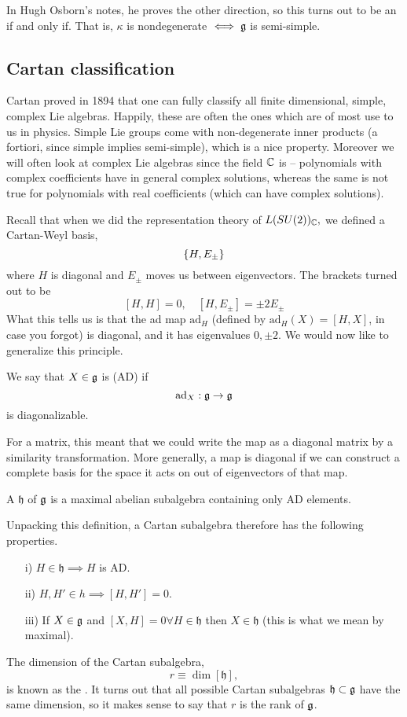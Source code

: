 In Hugh Osborn's notes, he proves the other direction, so this turns out to be an if and only if. That is, $\kappa$ is nondegenerate $\iff \mathfrak{g}$ is semi-simple.

\subsection*{Cartan classification} Cartan proved in 1894 that one can fully classify all finite dimensional, simple, complex Lie algebras. Happily, these are often the ones which are of most use to us in physics. Simple Lie groups come with non-degenerate inner products (a fortiori, since simple implies semi-simple), which is a nice property. Moreover we will often look at complex Lie algebras since the field $\mathbb{C}$ is -- polynomials with complex coefficients have in general complex solutions, whereas the same is not true for polynomials with real coefficients (which can have complex solutions).

Recall that when we did the representation theory of $L(SU(2))_{\mathbb{C}},$ we defined a Cartan-Weyl basis,
$$\{H,E_\pm\}$$ where $H$ is diagonal and $E_\pm$ moves us between eigenvectors. The brackets turned out to be
$$[H,H]=0,\quad [H,E_\pm]=\pm 2 E_{\pm}$$
What this tells us is that the ad map $\text{ad}_H$ (defined by $\text{ad}_H(X)=[H,X]$, in case you forgot) is diagonal, and it has eigenvalues $0,\pm 2$. We would now like to generalize this principle.
\begin{defn}
We say that $X\in \mathfrak{g}$ is  (AD) if
$$\text{ad}_X:\mathfrak{g} \to \mathfrak{g}$$
is diagonalizable.
\end{defn}
For a matrix, this meant that we could write the map as a diagonal matrix by a similarity transformation. More generally, a map is diagonal if we can construct a complete basis for the space it acts on out of eigenvectors of that map.

\begin{defn}
A  $\mathfrak{h}$ of $\mathfrak{g}$ is a maximal abelian subalgebra containing only AD elements.
\end{defn}
Unpacking this definition, a Cartan subalgebra therefore has the following properties.
\begin{itemize}
    \item[i)] $H\in \mathfrak{h}\implies H$ is AD.
    \item[ii)] $H,H'\in h \implies [H,H']=0.$
    \item[iii)] If $X\in \mathfrak{g}$ and $[X,H]=0 \forall H \in \mathfrak{h}$ then $X\in \mathfrak{h}$ (this is what we mean by maximal).
\end{itemize}
\begin{defn}
The dimension of the Cartan subalgebra,
$$r\equiv \dim[\mathfrak{h}],$$
is known as the . It turns out that all possible Cartan subalgebras $\mathfrak{h}\subset \mathfrak{g}$ have the same dimension, so it makes sense to say that $r$ is the rank of $\mathfrak{g}$.
\end{defn}

